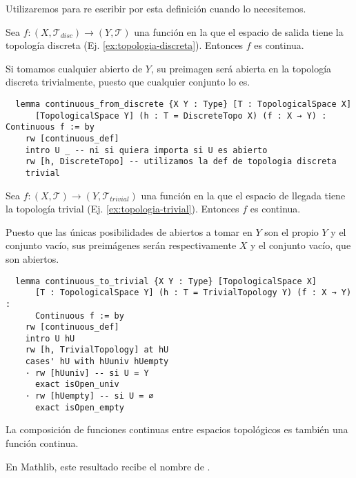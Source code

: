 Utilizaremos  para re escribir  por esta definición cuando lo necesitemos.

\begin{example}
  Sea $f : (X, \mathcal{T}_{disc}) \to (Y, \mathcal{T})$ una función en la que el espacio de salida tiene la topología discreta (Ej. \ref{ex:topologia-discreta}). Entonces $f$ es continua.

  Si tomamos cualquier abierto de $Y$, su preimagen será abierta en la topología discreta trivialmente, puesto que cualquier conjunto lo es.
\end{example}

\begin{lstlisting}
  lemma continuous_from_discrete {X Y : Type} [T : TopologicalSpace X]
      [TopologicalSpace Y] (h : T = DiscreteTopo X) (f : X → Y) : Continuous f := by
    rw [continuous_def]
    intro U _ -- ni si quiera importa si U es abierto
    rw [h, DiscreteTopo] -- utilizamos la def de topologia discreta
    trivial
\end{lstlisting}

\begin{example}
  Sea $f : (X, \mathcal{T}) \to (Y, \mathcal{T}_{trivial})$ una función en la que el espacio de llegada tiene la topología trivial (Ej. \ref{ex:topologia-trivial}). Entonces $f$ es continua.

  Puesto que las únicas posibilidades de abiertos a tomar en $Y$ son el propio $Y$ y el conjunto vacío, sus preimágenes serán respectivamente $X$ y el conjunto vacío, que son abiertos.
\end{example}

\begin{lstlisting}
  lemma continuous_to_trivial {X Y : Type} [TopologicalSpace X]
      [T : TopologicalSpace Y] (h : T = TrivialTopology Y) (f : X → Y) :
      Continuous f := by
    rw [continuous_def]
    intro U hU
    rw [h, TrivialTopology] at hU
    cases' hU with hUuniv hUempty
    · rw [hUuniv] -- si U = Y
      exact isOpen_univ
    · rw [hUempty] -- si U = ∅
      exact isOpen_empty
\end{lstlisting}

\begin{proposition}
  La composición de funciones continuas entre espacios topológicos es también una función continua.
\end{proposition}

En Mathlib, este resultado recibe el nombre de .


